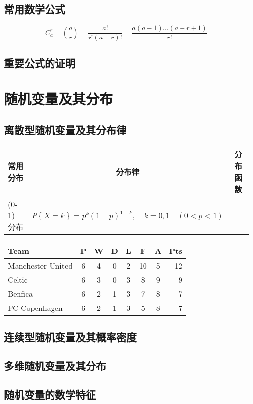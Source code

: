 \documentclass[11pt]{book}
\begin{document}
	\section{常用数学公式}
		\begin{equation}
			C_a ^r =\binom{a}{r}=\frac{a!}{r!(a-r)!}=\frac{a(a-1)\dots (a-r+1)}{r!}
		\end{equation}
	\section{重要公式的证明}
	\chapter{随机变量及其分布}
	\section{离散型随机变量及其分布律}
	\begin{tabular}{|l|c|c|}
		\hline
		常用分布 & 分布律 & 分布函数 \\
		\hline
		(0-1) 分布 & $
		P\left\lbrace X=k\right\rbrace =p^k\left( 1-p\right) ^{1-k},\hspace{1em}k=0,1 \hspace{1em}\left( 0<p<1\right) 
		$ & \\
		\hline
	\end{tabular}

\begin{tabular}{l*{6}{c}r}
	Team              & P & W & D & L & F  & A & Pts \\
	\hline
	Manchester United & 6 & 4 & 0 & 2 & 10 & 5 & 12  \\
	Celtic            & 6 & 3 & 0 & 3 &  8 & 9 &  9  \\
	Benfica           & 6 & 2 & 1 & 3 &  7 & 8 &  7  \\
	FC Copenhagen     & 6 & 2 & 1 & 3 &  5 & 8 &  7  \\
\end{tabular}
 



	\section{连续型随机变量及其概率密度}
	\section{多维随机变量及其分布}
	\section{随机变量的数学特征}
\end{document}
